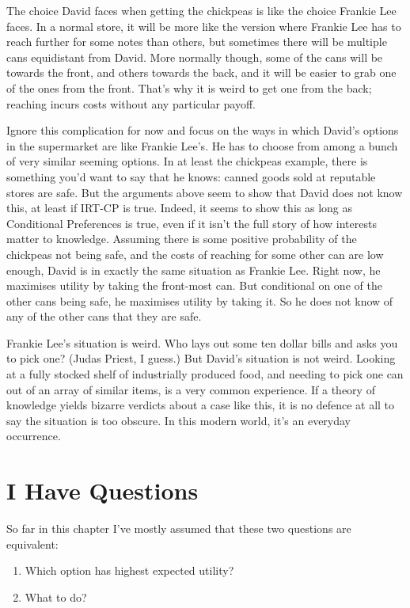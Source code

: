 \documentclass[
  10pt,
  letterpaper,
  twoside]{scrbook}
\providecommand{\tightlist}{%
  \setlength{\itemsep}{0pt}\setlength{\parskip}{0pt}}\usepackage{longtable,booktabs,array}
\begin{document}
The choice David faces when getting the chickpeas is like the choice
Frankie Lee faces. In a normal store, it will be more like the version
where Frankie Lee has to reach further for some notes than others, but
sometimes there will be multiple cans equidistant from David. More
normally though, some of the cans will be towards the front, and others
towards the back, and it will be easier to grab one of the ones from the
front. That's why it is weird to get one from the back; reaching incurs
costs without any particular payoff.

Ignore this complication for now and focus on the ways in which David's
options in the supermarket are like Frankie Lee's. He has to choose from
among a bunch of very similar seeming options. In at least the chickpeas
example, there is something you'd want to say that he knows: canned
goods sold at reputable stores are safe. But the arguments above seem to
show that David does not know this, at least if IRT-CP is true. Indeed,
it seems to show this as long as Conditional Preferences is true, even
if it isn't the full story of how interests matter to knowledge.
Assuming there is some positive probability of the chickpeas not being
safe, and the costs of reaching for some other can are low enough, David
is in exactly the same situation as Frankie Lee. Right now, he maximises
utility by taking the front-most can. But conditional on one of the
other cans being safe, he maximises utility by taking it. So he does not
know of any of the other cans that they are safe.

Frankie Lee's situation is weird. Who lays out some ten dollar bills and
asks you to pick one? (Judas Priest, I guess.) But David's situation is
not weird. Looking at a fully stocked shelf of industrially produced
food, and needing to pick one can out of an array of similar items, is a
very common experience. If a theory of knowledge yields bizarre verdicts
about a case like this, it is no defence at all to say the situation is
too obscure. In this modern world, it's an everyday occurrence.

\section{I Have Questions}\label{sec-supermarketquestions}

So far in this chapter I've mostly assumed that these two questions are
equivalent:

\begin{enumerate}
\def\labelenumi{\arabic{enumi}.}
\tightlist
\item
  Which option has highest expected utility?
\item
  What to do?
\end{enumerate}
\end{document}
